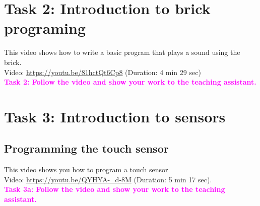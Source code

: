 \documentclass[11pt]{article}
\def\bluehref#1#2{\href{#1}{\color{blue} #2}}
\begin{document}
\section*{Task 2: Introduction to brick programing}


This video shows how to write a basic program that plays a sound using the brick.
\\
Video: 
\bluehref{https://youtu.be/81hctQt6Cp8}{https://youtu.be/81hctQt6Cp8} (Duration: 4 min 29 sec) \\
 \textcolor{magenta}{\bf Task 2: Follow the video and show your work to the teaching assistant.} 
 
 \section*{Task 3: Introduction to sensors}
 \subsection*{Programming the touch sensor}
This video shows you how to program a touch sensor \\
Video: 
\bluehref{https://youtu.be/QYHYA-\_d-8M}{https://youtu.be/QYHYA-\_d-8M} (Duration: 5 min 17 sec).\\
 \textcolor{magenta}{\bf Task 3a: Follow the video and show your work to the teaching assistant.}
\end{document}
